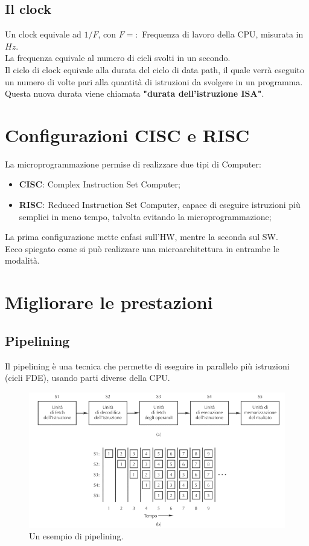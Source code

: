 \documentclass[12pt]{article}
\begin{document}
\subsection{Il clock}
Un clock equivale ad $1/F$, con $F =:$ Frequenza di lavoro della CPU, misurata in $Hz$.\\
La frequenza equivale al numero di cicli svolti in un secondo.\\
Il ciclo di clock equivale alla durata del ciclo di data path, il quale verrà eseguito un numero di volte pari alla quantità di istruzioni da svolgere in un programma.\\
Questa nuova durata viene chiamata \textbf{"durata dell'istruzione ISA"}.
\section{Configurazioni CISC e RISC}
La microprogrammazione permise di realizzare due tipi di Computer:
\begin{itemize}
    \item \textbf{CISC}: Complex Instruction Set Computer;
    \item \textbf{RISC}: Reduced Instruction Set Computer, capace di eseguire istruzioni più semplici in meno tempo, talvolta evitando la microprogrammazione;
\end{itemize}
La prima configurazione mette enfasi sull'HW, mentre la seconda sul SW.\\
Ecco spiegato come si può realizzare una microarchitettura in entrambe le modalità.
\pagebreak
\section{Migliorare le prestazioni}
\subsection{Pipelining}
Il pipelining è una tecnica che permette di eseguire in parallelo più istruzioni (cicli FDE), usando parti diverse della CPU.
\begin{figure}[!htb]
    \centering
    \includegraphics[width=1\textwidth, height=.7\textheight,keepaspectratio]{organizzazione_elab/pipelining.png} %
    \begin{center}
        \caption{\label{fig:pipelining_img}Un esempio di pipelining.} %
    \end{center}
\end{figure}
\end{document}
